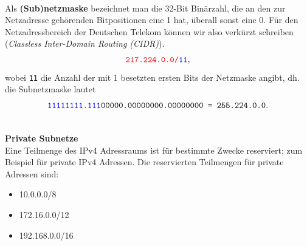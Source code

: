 ~\\
Als \textbf{(Sub)netzmaske} bezeichnet man die 32-Bit Binärzahl, die an den zur Netzadresse gehörenden Bitpositionen eine 1 hat, überall sonst eine 0.
Für den Netzadressbereich der Deutschen Telekom können wir also verkürzt schreiben (\textit{Classless Inter-Domain Routing (CIDR)}).
$$\texttt{\color{red}217.224.0.0/\color{blue}11},$$
wobei \texttt{\color{blue}11} die Anzahl der mit 1 besetzten ersten Bits der Netzmaske angibt, dh. die Subnetzmaske lautet
$$\texttt{{\color{blue}11111111.111}00000.00000000.00000000 = 255.224.0.0}.$$

%
%
%
%
~\\
\textbf{Private Subnetze}\\
Eine Teilmenge des IPv4 Adressraums ist für bestimmte Zwecke reserviert; zum Beispiel für private IPv4 Adressen. Die reservierten Teilmengen für private Adressen sind:
\begin{itemize}
	\item 10.0.0.0/8
	\item 172.16.0.0/12
     \item 192.168.0.0/16
\end{itemize}
